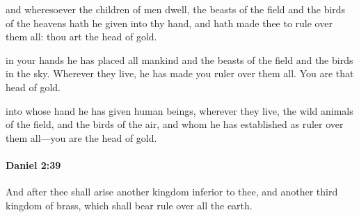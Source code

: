 			\begin{versebox}
					\item[BHS] 
					\item[LXX] 
					\item[ASV] and wheresoever the children of men dwell, the beasts of the field and the birds of the heavens hath he given into thy hand, and hath made thee to rule over them all: thou art the head of gold.
					\item[NIV] in your hands he has placed all mankind and the beasts of the field and the birds in the sky. Wherever they live, he has made you ruler over them all. You are that head of gold.
					\item[NRSV] into whose hand he has given human beings, wherever they live, the wild animals of the field, and the birds of the air, and whom he has established as ruler over them all—you are the head of gold.
			\end{versebox}

		\paragraph{Daniel 2:39} %
			\label{DANIEL-2-39}

			And after thee shall arise another kingdom inferior to thee, and another third kingdom of brass, which shall bear rule over all the earth.

